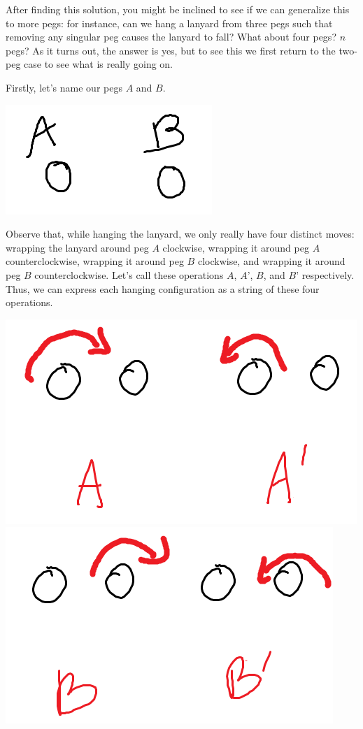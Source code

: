 \documentclass{article}
\begin{document}
After finding this solution, you might be inclined to see if we can generalize this to more pegs: for instance, can we hang a lanyard from three pegs such that removing any singular peg causes the lanyard to fall? What about four pegs? $n$ pegs? As it turns out, the answer is yes, but to see this we first return to the two-peg case to see what is really going on. 

Firstly, let's name our pegs $A$ and $B$. 

\begin{center}
    \includegraphics[scale = 0.6]{images/lanyard3.png}
\end{center}

Observe that, while hanging the lanyard, we only really have four distinct moves: wrapping the lanyard around peg $A$ clockwise, wrapping it around peg $A$ counterclockwise, wrapping it around peg $B$ clockwise, and wrapping it around peg $B$ counterclockwise. Let’s call these operations $A$, $A’$, $B$, and $B’$ respectively. Thus, we can express each hanging configuration as a string of these four operations. 

\begin{center}
    \includegraphics[scale=0.4]{images/lanyard41.png}
    \includegraphics[scale=0.4]{images/lanyard42.png}
\end{center}
\end{document}
